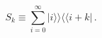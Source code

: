 \begin{equation}
 S_k\equiv \sum_{i=0}^{\infty} 
|i\rangle\!\rangle \langle\!\langle i+k |\,.\label{eq:5.11}
\end{equation}

